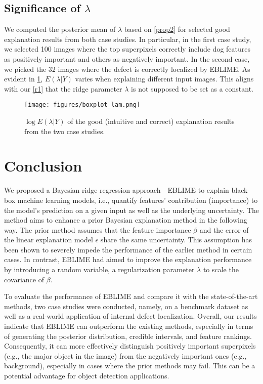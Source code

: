 \documentclass{article}
\theoremstyle{plain}
\theoremstyle{definition}
\theoremstyle{remark}
\begin{document}
\subsection{Significance of \texorpdfstring{$\lambda$}{lambda}}
We computed the posterior mean of $\lambda$ based on \cref{prop2} for selected good explanation results from both case studies. In particular, in the first case study, we selected 100 images where the top superpixels correctly include dog features as positively important and others as negatively important. In the second case, we picked the 32 images where the defect is correctly localized by EBLIME. As evident in \cref{lam_boxplot}, $E(\lambda|Y)$ varies when explaining different input images. This aligns with our \cref{r1} that the ridge parameter $\lambda$ is not supposed to be set as a constant.

\begin{figure}[ht]
\vskip 0.1in
\begin{center}
\centerline{\texttt{[image: figures/boxplot\_lam.png]}}
\caption{$\log{E(\lambda|Y)}$ of the good (intuitive and correct) explanation results from the two case studies.}
\label{lam_boxplot}
\end{center}
\end{figure}


\section{Conclusion}\label{conclusion}
We proposed a Bayesian ridge regression approach---EBLIME to explain black-box machine learning models, i.e., quantify features' contribution (importance) to the model's prediction on a given input as well as the underlying uncertainty. The method aims to enhance a prior Bayesian explanation method in the following way. The prior method assumes that the feature importance $\beta$ and the error of the linear explanation model $\epsilon$ share the same uncertainty. This assumption has been shown to severely impede the performance of the earlier method in certain cases. In contrast, EBLIME had aimed to improve the explanation performance by introducing a random variable, a regularization parameter $\lambda$ to scale the covariance of $\beta$. 

To evaluate the performance of EBLIME and compare it with the state-of-the-art methods, two case studies were conducted, namely, on a benchmark dataset as well as a real-world application of internal defect localization.  Overall, our results indicate that EBLIME can outperform the existing methods, especially in terms of generating the posterior distribution, credible intervals, and feature rankings. Consequently, it can more effectively distinguish positively important superpixels (e.g., the major object in the image) from the negatively important ones (e.g., background), especially in cases where the prior methods may fail. This can be a potential advantage for object detection applications.
\end{document}
